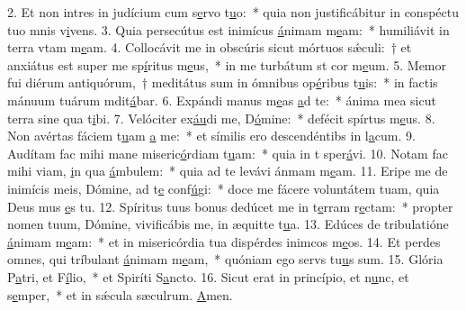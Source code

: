 2. Et non intres in judícium cum s\uline{e}rvo t\uline{u}o:~* quia non justificábitur in conspéctu tuo mnis v\uline{i}vens.
3. Quia persecútus est inimícus \uline{á}nimam m\uline{e}am:~* humiliávit in terra vtam m\uline{e}am.
4. Collocávit me in obscúris sicut mórtuos sǽculi:~† et anxiátus est super me sp\uline{í}ritus m\uline{e}us,~* in me turbátum st cor m\uline{e}um.
5. Memor fui diérum antiquórum,~† meditátus sum in ómnibus op\uline{é}ribus t\uline{u}is:~* in factis mánuum tuárum mdit\uline{á}bar.
6. Expándi manus m\uline{e}as \uline{a}d te:~* ánima mea sicut terra sine qua t\uline{i}bi.
7. Velóciter ex\uline{áu}di me, D\uline{ó}mine:~* defécit spírtus m\uline{e}us.
8. Non avértas fáciem t\uline{u}am \uline{a} me:~* et símilis ero descendéntibs in l\uline{a}cum.
9. Audítam fac mihi mane miseric\uline{ó}rdiam t\uline{u}am:~* quia in t sper\uline{á}vi.
10. Notam fac mihi viam, \uline{i}n qua \uline{á}mbulem:~* quia ad te levávi ánmam m\uline{e}am.
11. Eripe me de inimícis meis, Dómine, ad t\uline{e} conf\uline{ú}gi:~* doce me fácere voluntátem tuam, quia Deus mus \uline{e}s tu.
12. Spíritus tuus bonus dedúcet me in t\uline{e}rram r\uline{e}ctam:~* propter nomen tuum, Dómine, vivificábis me, in æquitte t\uline{u}a.
13. Edúces de tribulatióne \uline{á}nimam m\uline{e}am:~* et in misericórdia tua dispérdes inimcos m\uline{e}os.
14. Et perdes omnes, qui tríbulant \uline{á}nimam m\uline{e}am,~* quóniam ego servs tu\uline{u}s sum.
15. Glória P\uline{a}tri, et F\uline{í}lio,~* et Spiríti S\uline{a}ncto.
16. Sicut erat in princípio, et n\uline{u}nc, et s\uline{e}mper,~* et in sǽcula sæculrum. \uline{A}men.
